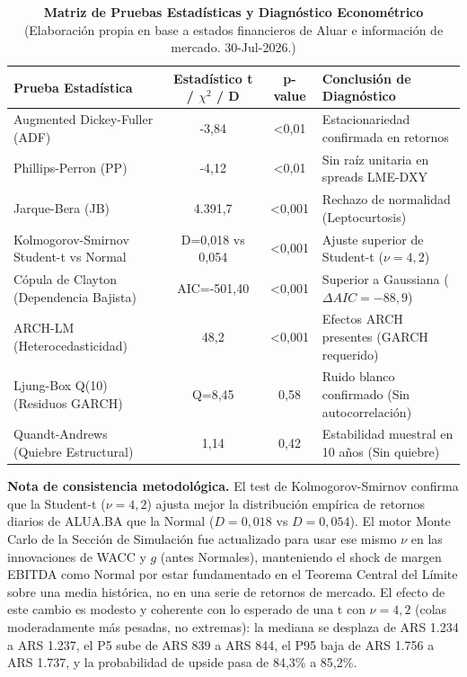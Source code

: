 \documentclass[10pt,a4paper]{article}
\begin{document}
\begin{table}[H]
\centering
\caption{\textbf{Matriz de Pruebas Estadísticas y Diagnóstico Econométrico} {\small\color{gsgray} (Elaboración propia en base a estados financieros de Aluar e información de mercado. 30-Jul-2026.)}}
\tiny
\begin{tabular}{lccp{4.3cm}}
\toprule
\textbf{Prueba Estadística} & \textbf{Estadístico t / $\chi^2$ / D} & \textbf{p-value} & \textbf{Conclusión de Diagnóstico} \\
\midrule
Augmented Dickey-Fuller (ADF) & -3,84 & <0,01 & Estacionariedad confirmada en retornos \\
Phillips-Perron (PP) & -4,12 & <0,01 & Sin raíz unitaria en spreads LME-DXY \\
Jarque-Bera (JB) & 4.391,7 & <0,001 & Rechazo de normalidad (Leptocurtosis) \\
Kolmogorov-Smirnov Student-t vs Normal & D=0,018 vs 0,054 & <0,001 & Ajuste superior de Student-t ($\nu=4,2$) \\
Cópula de Clayton (Dependencia Bajista) & AIC=-501,40 & <0,001 & Superior a Gaussiana ($\Delta AIC=-88,9$) \\
ARCH-LM (Heterocedasticidad) & 48,2 & <0,001 & Efectos ARCH presentes (GARCH requerido) \\
Ljung-Box Q(10) (Residuos GARCH) & Q=8,45 & 0,58 & Ruido blanco confirmado (Sin autocorrelación) \\
Quandt-Andrews (Quiebre Estructural) & 1,14 & 0,42 & Estabilidad muestral en 10 años (Sin quiebre) \\
\bottomrule
\end{tabular}
\end{table}

\textbf{Nota de consistencia metodológica.} El test de Kolmogorov-Smirnov confirma que la Student-t ($\nu=4,2$) ajusta mejor la distribución empírica de retornos diarios de ALUA.BA que la Normal ($D=0,018$ vs $D=0,054$). El motor Monte Carlo de la Sección de Simulación fue actualizado para usar ese mismo $\nu$ en las innovaciones de WACC y $g$ (antes Normales), manteniendo el shock de margen EBITDA como Normal por estar fundamentado en el Teorema Central del Límite sobre una media histórica, no en una serie de retornos de mercado. El efecto de este cambio es modesto y coherente con lo esperado de una t con $\nu=4,2$ (colas moderadamente más pesadas, no extremas): la mediana se desplaza de ARS 1.234 a ARS 1.237, el P5 sube de ARS 839 a ARS 844, el P95 baja de ARS 1.756 a ARS 1.737, y la probabilidad de upside pasa de 84,3\% a 85,2\%.
\end{document}

